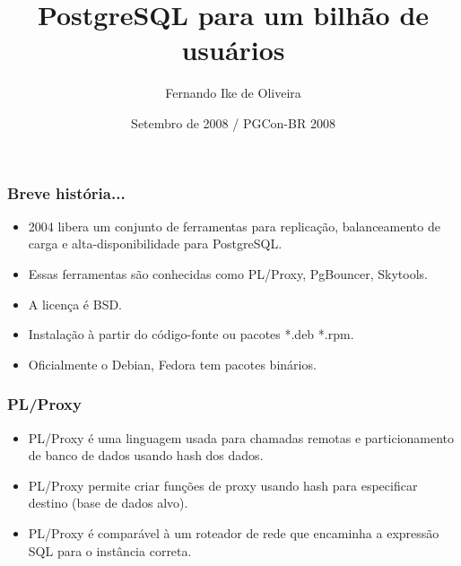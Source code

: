 \documentclass{beamer}
\title[Pgbouncer, plproxy, skytools]
{%
   PostgreSQL para um bilhão de usuários%
}
\author[Fernando Ike de Oliveira]
{
   \textcolor{red!50!black}{Fernando Ike de Oliveira}
}
\institute[B2BR]
{
 \textcolor{green!30!black}{B2BR - Grupo TBA}
}
\date[Short Occasion]
{Setembro de 2008 / PGCon-BR 2008}
\begin{document}
\begin{frame}
\titlepage
\end{frame}




\begin{frame}
  \frametitle{\textbf{Breve história...}}
    \begin{itemize}
      \item 2004 libera um conjunto de ferramentas para 
          replicação, balanceamento de carga e alta-disponibilidade 
	  para PostgreSQL.
      \item Essas ferramentas são conhecidas como PL/Proxy, 
          PgBouncer, Skytools.
      \item A licença é BSD.
      \item Instalação à partir do código-fonte ou pacotes *.deb *.rpm.
      \item Oficialmente o Debian, Fedora tem pacotes binários.
      \end{itemize}

\end{frame}

\begin{frame}
  \frametitle{\textbf{PL/Proxy}}
    \begin{itemize}
      \item PL/Proxy é uma linguagem usada para chamadas remotas
        e particionamento de banco de dados usando hash dos dados.
      \item PL/Proxy permite criar funções de proxy usando hash
        para especificar destino (base de dados alvo). 
      \item PL/Proxy é comparável à um roteador de rede que encaminha a 
        expressão SQL para o instância correta.
  \end{itemize}

\end{frame}
\end{document}
